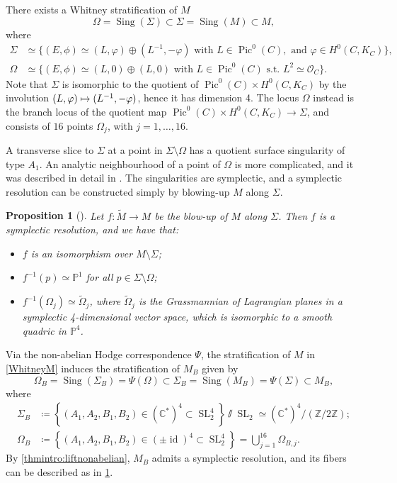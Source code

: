 \documentclass[JEP,XML,SOM,Unicode, NoEqCountersInSection,NoFloatCountersInSection,published]{cedram}
\let\mathcal\mathscr
\newcommand\mto{\mathchoice{\longmapsto}{\mapsto}{\mapsto}{\mapsto}}
\newtheorem{prop}[thm]{Proposition}
\theoremstyle{definition}
\newcommand{\CC}{\mathbb{C}}
\newcommand{\PP}{\mathbb{P}}
\newcommand{\ZZ}{\mathbb{Z}}
\newcommand{\Sl}{\operatorname{SL}}
\newcommand{\id}{\operatorname{id}}
\newcommand{\Pic}{\operatorname{Pic}}
\newcommand{\Sing}{\operatorname{Sing}}
\newcommand{\tm}{\widetilde{M}}
\newcommand{\tomega}{\widetilde{\Omega}}
\begin{document}
There exists a Whitney stratification of $M$
\begin{equation}\label{WhitneyM}
\Omega = \Sing(\Sigma) \subset\Sigma = \Sing(M) \subset M,
\end{equation}
where
\begin{align*}
\Sigma& \simeq \bigl\lbrace(E,\phi)\simeq (L,\varphi)\oplus (L^{-1},-\varphi) \text{ with }L\in \Pic^0(C),\text{ and }\varphi\in H^{0}(C, K_C)\bigr \rbrace,\\
\Omega& \simeq \bigl\lbrace(E,\phi)\simeq (L,0)\oplus (L,0) \text{ with }L\in \Pic^0(C)\text{ s.t. }L^2\simeq\mathcal{O}_C \bigr \rbrace.
\end{align*}
Note that $\Sigma$ is isomorphic to the quotient of $\Pic^0(C)\times H^0(C, K_C)$ by the involution $(L,\varphi)\mto (L^{-1},-\varphi)$, hence it has dimension 4. The locus $\Omega$ instead is the branch locus of the quotient map $\Pic^0(C)\times H^0(C, K_C) \to \Sigma$, and consists of $16$ points $\Omega_j$, with $j=1, \ldots, 16$.

A transverse slice to $\Sigma$ at a point in $\Sigma \setminus \Omega$ has a quotient surface singularity of type $A_1$. An analytic neighbourhood of a point of $\Omega$ is more complicated, and it was described in detail in \cite{LehnSorger2006}. The singularities are symplectic, and a symplectic resolution can be constructed simply by blowing-up $M$ along $\Sigma$.

\begin{prop}[{\cite[Prop.\,4.2]{Felisetti2018}}]\label{prop:fibresf}
Let $f\colon \tm \to M$ be the blow-up of $M$ along $\Sigma$. Then $f$ is a symplectic resolution, and we have that:
\begin{itemize}
\item $f$ is an isomorphism over $M\setminus \Sigma$;
\item $f^{-1}(p)\simeq \mathbb{P}^1$ for all $p\in \Sigma\setminus \Omega$;
\item $f^{-1}(\Omega_j)\simeq \tomega_j$, where $\tomega_j$ is the Grassmannian of Lagrangian planes in a symplectic 4-dimensional vector space, which is isomorphic to a smooth quadric in $\PP^4$.
\end{itemize}
\end{prop}
Via the non-abelian Hodge correspondence $\Psi$, the stratification of $M$ in \eqref{WhitneyM} induces the stratification of $M_B$ given by
\begin{equation}\label{WhitneyMB}
\Omega_B = \Sing(\Sigma_B)=\Psi(\Omega) \subset\Sigma_B = \Sing(M_B) = \Psi(\Sigma) \subset M_B,
\end{equation}
where
\begin{align}
\Sigma_B &\coloneqq\left\lbrace (A_1, A_2, B_1, B_2) \in (\CC^*)^{4} \subset \Sl^{4}_2\right \rbrace\sslash \Sl_2 \simeq (\CC^*)^{ 4}/(\ZZ/2\ZZ); \label{descriptionSigmaB}\\
\Omega_B&\coloneqq\left\lbrace (A_1, A_2, B_1, B_2) \in (\pm \id)^{4} \subset \Sl^{ 4}_2\right \rbrace = \bigcup^{16}_{j=1}\Omega_{B, j}. \nonumber
\end{align}
By \cref{thmintro:liftnonabelian}, $M_B$ admits a symplectic resolution, and its fibers can be described as in \cref{prop:fibresf}.
\end{document}
